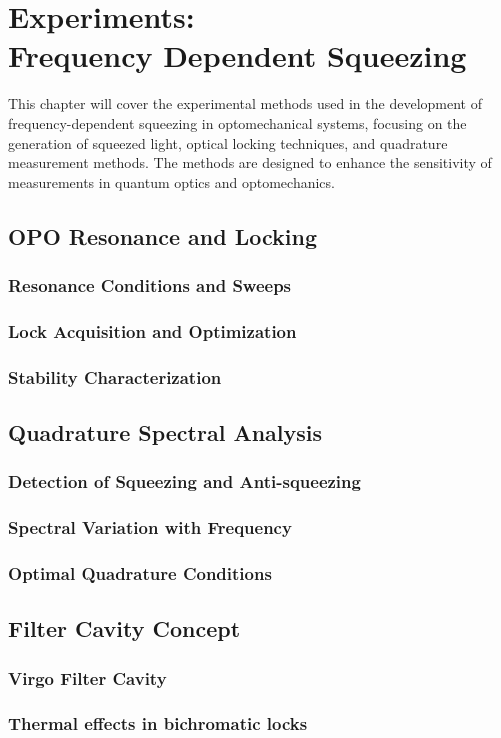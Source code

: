 \chapter{Experiments: \\ Frequency Dependent Squeezing}
This chapter will cover the experimental methods used in the development of frequency-dependent squeezing in optomechanical systems, focusing on the generation of squeezed light, optical locking techniques, and quadrature measurement methods. The methods are designed to enhance the sensitivity of measurements in quantum optics and optomechanics.
\minitoc
\newpage 

\section{OPO Resonance and Locking}
\subsection{Resonance Conditions and Sweeps}
\subsection{Lock Acquisition and Optimization}
\subsection{Stability Characterization}
\section{Quadrature Spectral Analysis}
\subsection{Detection of Squeezing and Anti-squeezing}
\subsection{Spectral Variation with Frequency}
\subsection{Optimal Quadrature Conditions}
\section{Filter Cavity Concept}
\subsection{Virgo Filter Cavity }
\subsection{Thermal effects in bichromatic locks}